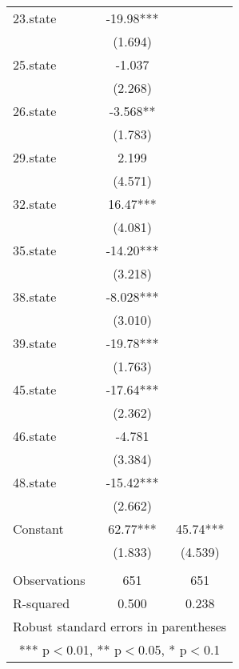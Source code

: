 \begin{tabular}{lcc}
23.state & -19.98*** &  \\
 & (1.694) &  \\
25.state & -1.037 &  \\
 & (2.268) &  \\
26.state & -3.568** &  \\
 & (1.783) &  \\
29.state & 2.199 &  \\
 & (4.571) &  \\
32.state & 16.47*** &  \\
 & (4.081) &  \\
35.state & -14.20*** &  \\
 & (3.218) &  \\
38.state & -8.028*** &  \\
 & (3.010) &  \\
39.state & -19.78*** &  \\
 & (1.763) &  \\
45.state & -17.64*** &  \\
 & (2.362) &  \\
46.state & -4.781 &  \\
 & (3.384) &  \\
48.state & -15.42*** &  \\
 & (2.662) &  \\
Constant & 62.77*** & 45.74*** \\
 & (1.833) & (4.539) \\
 &  &  \\
Observations & 651 & 651 \\
 R-squared & 0.500 & 0.238 \\ \hline
\multicolumn{3}{c}{ Robust standard errors in parentheses} \\
\multicolumn{3}{c}{ *** p$<$0.01, ** p$<$0.05, * p$<$0.1} \\
\end{tabular}
